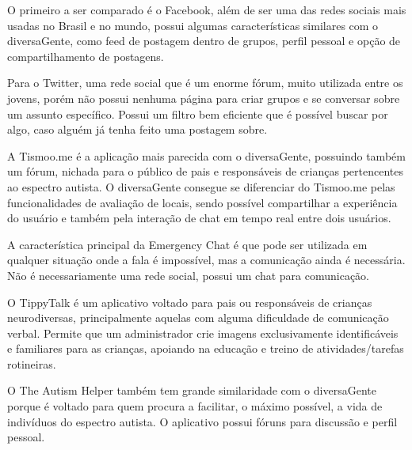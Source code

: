 O primeiro a ser comparado é o Facebook, além de ser uma das redes sociais mais usadas no Brasil e no mundo, possui algumas características similares com o diversaGente, como feed de postagem dentro de grupos, perfil pessoal e opção de compartilhamento de postagens. 

Para o Twitter, uma rede social que é um enorme fórum, muito utilizada entre os jovens, porém não possui nenhuma página para criar grupos e se conversar sobre um assunto específico. Possui um filtro bem eficiente que é possível buscar por algo, caso alguém já tenha feito uma postagem sobre. 

A Tismoo.me é a aplicação mais parecida com o diversaGente, possuindo também um fórum, nichada para o público de pais e responsáveis de crianças pertencentes ao espectro autista. O diversaGente consegue se diferenciar do Tismoo.me pelas funcionalidades de avaliação de locais, sendo possível compartilhar a experiência do usuário e também pela interação de chat em tempo real entre dois usuários. 

A característica principal da Emergency Chat é que pode ser utilizada em qualquer situação onde a fala é impossível, mas a comunicação ainda é necessária. Não é necessariamente uma rede social, possui um chat para comunicação.  

O TippyTalk é um aplicativo voltado para pais ou responsáveis de crianças neurodiversas, principalmente aquelas com alguma dificuldade de comunicação verbal. Permite que um administrador crie imagens exclusivamente identificáveis e familiares para as crianças, apoiando na educação e treino de atividades/tarefas rotineiras. 

O The Autism Helper também tem grande similaridade com o diversaGente porque é voltado para quem procura a facilitar, o máximo possível, a vida de indivíduos do espectro autista. O aplicativo possui fóruns para discussão e perfil pessoal. 


